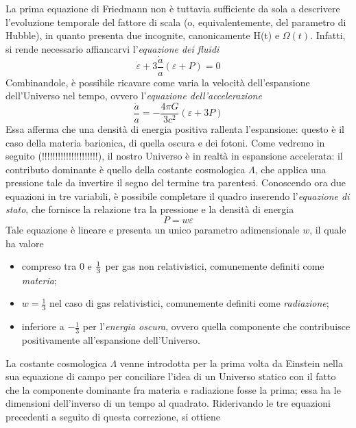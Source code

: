 La prima equazione di Friedmann non è tuttavia sufficiente da sola a descrivere l'evoluzione temporale del fattore di scala (o, equivalentemente, del parametro di Hubble), in quanto presenta due incognite, canonicamente H(t) e $\Omega(t)$.
Infatti, si rende necessario affiancarvi l'\emph{equazione dei fluidi}
\begin{equation}
    \dot{\varepsilon}+3\frac{\dot{a}}{a}(\varepsilon + P)=0
\end{equation}
Combinandole, è possibile ricavare come varia la velocità dell'espansione dell'Universo nel tempo, ovvero l'\emph{equazione dell'accelerazione}
\begin{equation}
    \frac{\ddot{a}}{a} = -\frac{4\pi G}{3c^2}(\varepsilon+3P)
\end{equation}
Essa afferma che una densità di energia positiva rallenta l'espansione: questo è il caso della materia barionica, di quella oscura e dei fotoni.
Come vedremo in seguito {(\color{red}!!!!!!!!!!!!!!!!!!!!!)}, il nostro Universo è in realtà in espansione accelerata: il contributo dominante è quello della costante cosmologica $\Lambda$, che applica una pressione tale da invertire il segno del termine tra parentesi.
Conoscendo ora due equazioni in tre variabili, è possibile completare il quadro inserendo l'\emph{equazione di stato}, che fornisce la relazione tra la pressione e la densità di energia
\begin{equation}
    P=w \varepsilon
\end{equation}
Tale equazione è lineare e presenta un unico parametro adimensionale $w$, il quale ha valore
\begin{itemize}
    \item compreso tra 0 e $1 \over 3$ per gas non relativistici, comunemente definiti come \emph{materia};
    \item $w=\frac{1}{3}$ nel caso di gas relativistici, comunemente definiti come \emph{radiazione};
    \item inferiore a $-\frac{1}{3}$ per l'\emph{energia oscura}, ovvero quella componente che contribuisce positivamente all'espansione dell'Universo.
\end{itemize}
La costante cosmologica $\Lambda$ venne introdotta per la prima volta da Einstein nella sua equazione di campo per conciliare l'idea di un Universo statico con il fatto che la componente dominante fra materia e radiazione fosse la prima;
essa ha le dimensioni dell'inverso di un tempo al quadrato.
Riderivando le tre equazioni precedenti a seguito di questa correzione, si ottiene

